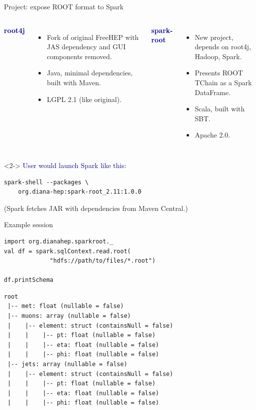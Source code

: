 \documentclass{beamer}
\begin{document}
\begin{frame}[fragile]{Project: expose ROOT format to Spark}
\vspace{0.5 cm}
\begin{columns}[t]
\textcolor{darkblue}{\large \bf root4j}

\vspace{0.1 cm}
\begin{itemize}
\item Fork of original FreeHEP with JAS dependency and GUI components removed.
\item Java, minimal dependencies, built with Maven.
\item LGPL 2.1 (like original).
\end{itemize}

\textcolor{darkblue}{\large \bf spark-root}

\vspace{0.1 cm}
\begin{itemize}
\item New project, depends on root4j, Hadoop, Spark.
\item Presents ROOT TChain as a Spark DataFrame.
\item Scala, built with SBT.
\item Apache 2.0.
\end{itemize}
\end{columns}

\vspace{1 cm}
\begin{uncoverenv}<2->
\textcolor{darkblue}{\large User would launch Spark like this:}

\small
\begin{verbatim}
spark-shell --packages \
    org.diana-hep:spark-root_2.11:1.0.0
\end{verbatim}

\normalsize
(Spark fetches JAR with dependencies from Maven Central.)
\end{uncoverenv}
\end{frame}

\begin{frame}[fragile]{Example session}
\small
\vspace{0.5 cm}
\begin{verbatim}
import org.dianahep.sparkroot._
val df = spark.sqlContext.read.root(
             "hdfs://path/to/files/*.root")

df.printSchema
\end{verbatim}
\begin{verbatim}
root
 |-- met: float (nullable = false)
 |-- muons: array (nullable = false)
 |    |-- element: struct (containsNull = false)
 |    |    |-- pt: float (nullable = false)
 |    |    |-- eta: float (nullable = false)
 |    |    |-- phi: float (nullable = false)
 |-- jets: array (nullable = false)
 |    |-- element: struct (containsNull = false)
 |    |    |-- pt: float (nullable = false)
 |    |    |-- eta: float (nullable = false)
 |    |    |-- phi: float (nullable = false)
\end{verbatim}
\end{frame}
\end{document}

